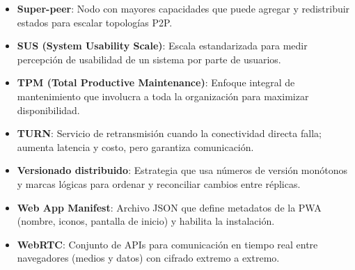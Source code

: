 \documentclass[10pt,a4paper]{report}
\begin{document}
\begin{itemize}
    \item \textbf{Super-peer}: Nodo con mayores capacidades que puede agregar y redistribuir estados para escalar topologías P2P.
    \item \textbf{SUS (System Usability Scale)}: Escala estandarizada para medir percepción de usabilidad de un sistema por parte de usuarios.
    \item \textbf{TPM (Total Productive Maintenance)}: Enfoque integral de mantenimiento que involucra a toda la organización para maximizar disponibilidad.
    \item \textbf{TURN}: Servicio de retransmisión cuando la conectividad directa falla; aumenta latencia y costo, pero garantiza comunicación.
    \item \textbf{Versionado distribuido}: Estrategia que usa números de versión monótonos y marcas lógicas para ordenar y reconciliar cambios entre réplicas.
    \item \textbf{Web App Manifest}: Archivo JSON que define metadatos de la PWA (nombre, iconos, pantalla de inicio) y habilita la instalación.
    \item \textbf{WebRTC}: Conjunto de APIs para comunicación en tiempo real entre navegadores (medios y datos) con cifrado extremo a extremo.
\end{itemize}




\end{document}
